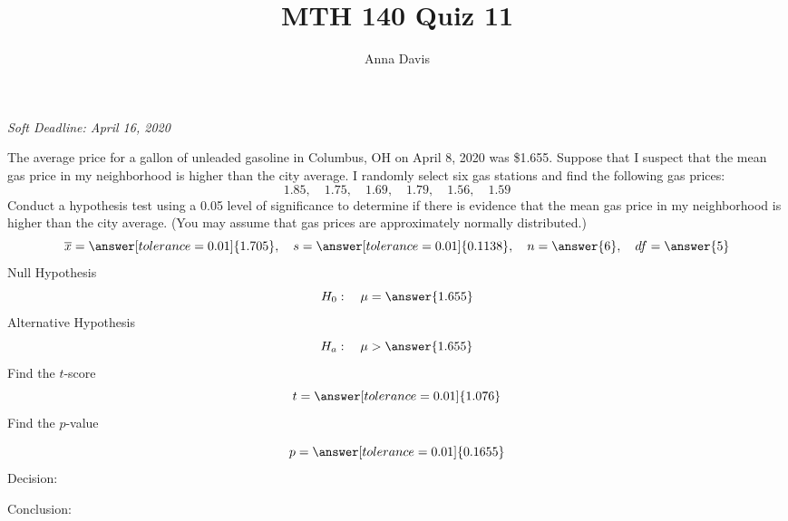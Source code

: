 \documentclass{ximera}
\author{Anna Davis} \title{MTH 140 Quiz 11}
\begin{document}
\begin{abstract}

\end{abstract}
\maketitle
 \textit{Soft Deadline: April 16, 2020}
\begin{problem}\label{prob:140quiz11prob1}
The average price for a gallon of unleaded gasoline in Columbus, OH on April 8, 2020 was \$1.655.  Suppose that I suspect that the mean gas price in my neighborhood is higher than the city average.  I randomly select six gas stations and find the following gas prices:
$$1.85,\quad 1.75, \quad 1.69,\quad 1.79,\quad 1.56,\quad 1.59$$
Conduct a hypothesis test using a 0.05 level of significance to determine if there is evidence that the mean gas price in my neighborhood is higher than the city average.  (You may assume that gas prices are approximately normally distributed.)
$$\overline{x}=\answer[tolerance=0.01]{1.705},\quad s=\answer[tolerance=0.01]{0.1138},\quad n=\answer{6},\quad df=\answer{5}$$
Null Hypothesis
$$H_0:\quad \mu=\answer{1.655}$$
Alternative Hypothesis
$$H_a:\quad \mu>\answer{1.655}$$
Find the $t$-score
$$t=\answer[tolerance=0.01]{1.076}$$
Find the $p$-value
\begin{center}  
\end{center}
$$p=\answer[tolerance=0.01]{0.1655}$$
Decision:

\begin{multipleChoice} 
\end{multipleChoice}  

Conclusion:

\begin{multipleChoice} 
\end{multipleChoice} 
\end{problem}
\end{document}
